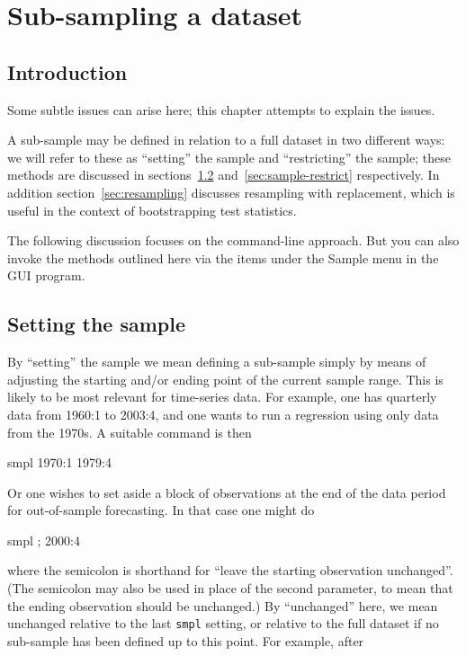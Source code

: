 \chapter{Sub-sampling a dataset}
\label{sampling}

\section{Introduction}
\label{sample-intro}

Some subtle issues can arise here; this chapter attempts to explain
the issues.

A sub-sample may be defined in relation to a full dataset in two
different ways: we will refer to these as ``setting'' the sample and
``restricting'' the sample; these methods are discussed in
sections~\ref{sec:sample-set} and~\ref{sec:sample-restrict}
respectively. In addition section~\ref{sec:resampling} discusses
resampling with replacement, which is useful in the context of
bootstrapping test statistics.

The following discussion focuses on the command-line approach. But you
can also invoke the methods outlined here via the items under the
\textsf{Sample} menu in the GUI program.


\section{Setting the sample}
\label{sec:sample-set}

By ``setting'' the sample we mean defining a sub-sample simply by
means of adjusting the starting and/or ending point of the current
sample range.  This is likely to be most relevant for time-series
data.  For example, one has quarterly data from 1960:1 to 2003:4, and
one wants to run a regression using only data from the 1970s.  A
suitable command is then

\begin{code}
smpl 1970:1 1979:4
\end{code}

Or one wishes to set aside a block of observations at the end of the
data period for out-of-sample forecasting.  In that case one might do

\begin{code}
smpl ; 2000:4
\end{code}

where the semicolon is shorthand for ``leave the starting observation
unchanged''.  (The semicolon may also be used in place of the second
parameter, to mean that the ending observation should be unchanged.)
By ``unchanged'' here, we mean unchanged relative to the last
\verb+smpl+ setting, or relative to the full dataset if no sub-sample
has been defined up to this point. For example, after

